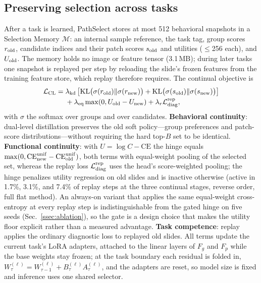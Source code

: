 \documentclass{article}
\def\L{{\cal L}}
\newcommand{\Fg}{F_g}
\newcommand{\Fp}{F_p}
\newcommand{\Mem}{\mathcal{M}}
\begin{document}
\subsection{Preserving selection across tasks}
\label{ssec:cl}

After a task is learned, PathSelect stores at most 512 behavioral snapshots in a Selection Memory $\Mem$: an internal sample reference, the task tag, group scores $r_{\rm old}$, candidate indices and their patch scores $s_{\rm old}$ and utilities ($\le$256 each), and $U_{\rm old}$. The memory holds no image or feature tensor (3.1\,MB); during later tasks one snapshot is replayed per step by reloading the slide's frozen features from the training feature store, which replay therefore requires. The continual objective is
\begin{align}
\L_{\mathrm{CL}}
={}&
\lambda_{\mathrm{kd}}
\left[
\mathrm{KL}\bigl(\sigma(r_{\mathrm{old}})\Vert \sigma(r_{\mathrm{new}})\bigr)
+
\mathrm{KL}\bigl(\sigma(s_{\mathrm{old}})\Vert \sigma(s_{\mathrm{new}})\bigr)
\right]
\nonumber\\
&+
\lambda_{\mathrm{eq}}
\max(0,U_{\mathrm{old}}-U_{\mathrm{new}})
+
\lambda_r \L_{\mathrm{diag}}^{\mathrm{rep}},
\label{eq:lcl}
\end{align}
with $\sigma$ the softmax over groups and over candidates. \textbf{Behavioral continuity}: dual-level distillation preserves the old soft policy---group preferences and patch-score distributions---without requiring the hard top-$B$ set to be identical. \textbf{Functional continuity}: with $U=\log C-\mathrm{CE}$ the hinge equals $\max(0,\mathrm{CE}^{\rm unif}_{\rm new}-\mathrm{CE}^{\rm unif}_{\rm old})$, both terms with equal-weight pooling of the selected set, whereas the replay loss $\L_{\mathrm{diag}}^{\mathrm{rep}}$ uses the head's score-weighted pooling; the hinge penalizes utility regression on old slides and is inactive otherwise (active in 1.7\%, 3.1\%, and 7.4\% of replay steps at the three continual stages, reverse order, full flat method). An always-on variant that applies the same equal-weight cross-entropy at every replay step is indistinguishable from the gated hinge on five seeds (Sec.~\ref{ssec:ablation}), so the gate is a design choice that makes the utility floor explicit rather than a measured advantage. \textbf{Task competence}: replay applies the ordinary diagnostic loss to replayed old slides. All terms update the current task's LoRA adapters, attached to the linear layers of $\Fg$ and $\Fp$ while the base weights stay frozen; at the task boundary each residual is folded in, $W^{(\ell)}_{\tau}=W^{(\ell)}_{\tau-1}+B^{(\ell)}_\tau A^{(\ell)}_\tau$, and the adapters are reset, so model size is fixed and inference uses one shared selector.
\end{document}
